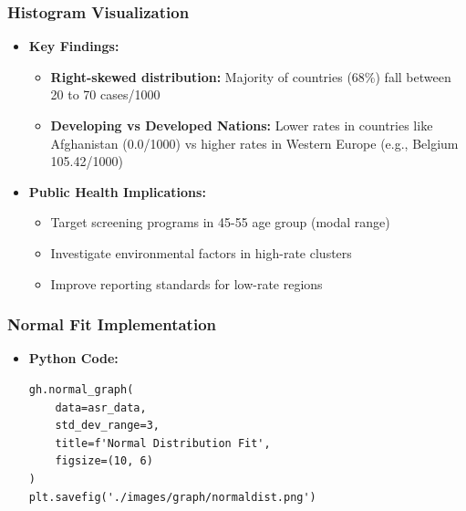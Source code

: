 \begin{frame}
    \frametitle{Histogram Visualization}
    \begin{itemize}
        \item \textbf{Key Findings:}
        \begin{itemize}
            \item \textbf{Right-skewed distribution:} Majority of countries (68\%) fall between 20 to 70 cases/1000
            \item \textbf{Developing vs Developed Nations:} Lower rates in countries like Afghanistan (0.0/1000) vs higher rates in Western Europe (e.g., Belgium 105.42/1000)
        \end{itemize}
        
        \item \textbf{Public Health Implications:}
        \begin{itemize}
            \item Target screening programs in 45-55 age group (modal range)
            \item Investigate environmental factors in high-rate clusters
            \item Improve reporting standards for low-rate regions
        \end{itemize}
    \end{itemize}
\end{frame}

\begin{frame}[fragile]
    \frametitle{Normal Fit Implementation}
    \begin{itemize}
        \item \textbf{Python Code:}
        \begin{lstlisting}
gh.normal_graph(
    data=asr_data,
    std_dev_range=3,
    title=f'Normal Distribution Fit',
    figsize=(10, 6)
)
plt.savefig('./images/graph/normaldist.png')
        \end{lstlisting}
    \end{itemize}
\end{frame}

